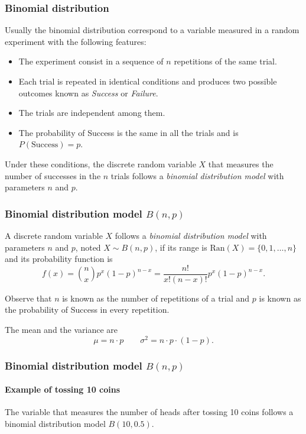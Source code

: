 \begin{frame}
\frametitle{Binomial distribution}
Usually the binomial distribution correspond to a variable measured in a random experiment with the following features:
\begin{itemize}
\item The experiment consist in a sequence of $n$ repetitions of the same trial.
\item Each trial is repeated in identical conditions and produces two possible outcomes known as \emph{Success} or
\emph{Failure}.
\item The trials are independent among them.
\item The probability of Success is the same in all the trials and is $P(\mbox{Success})=p$.
\end{itemize}

Under these conditions, the discrete random variable $X$ that measures the number of successes in the $n$ trials follows
a \emph{binomial distribution model} with parameters $n$ and $p$.
\end{frame}


\begin{frame}
\frametitle{Binomial distribution model $B(n,p)$}
\begin{definition}
A discrete random variable $X$ follows a \emph{binomial distribution model} with parameters $n$ and $p$, noted 
$X\sim B(n,p)$, if its range is $\mbox{Ran}(X) = \{0,1,\ldots,n\}$ and its probability function is
\[
f(x) = \binom{n}{x}p^x(1-p)^{n-x} = \frac{n!}{x!(n-x)!}p^x(1-p)^{n-x}.
\]
\end{definition}

Observe that $n$ is known as the number of repetitions of a trial and $p$ is known as the probability of Success in
every repetition. 

The mean and the variance are
\[
\mu = n\cdot p \qquad \sigma^2 = n\cdot p\cdot (1-p).
\]
\end{frame}


\begin{frame}
\frametitle{Binomial distribution model $B(n,p)$}
\framesubtitle{Example of tossing 10 coins}
The variable that measures the number of heads after tossing 10 coins follows a binomial distribution model $B(10,0.5)$.
\begin{center}
\end{center}
\end{frame}


